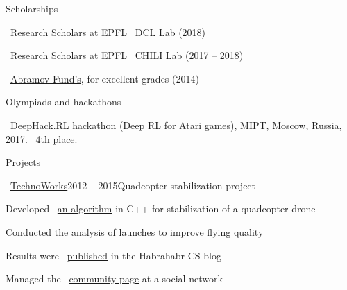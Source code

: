 \documentclass{resume} %
\begin{document}
\begin{rSection}{Scholarships}
\vspace{-1em}
\item \faExternalLink~\href{https://ic.epfl.ch/ResearchScholars}{Research Scholars} at EPFL \faExternalLink~\href{http://dcl.epfl.ch}{DCL} Lab (2018)
\item \faExternalLink~\href{https://ic.epfl.ch/ResearchScholars}{Research Scholars} at EPFL \faExternalLink~\href{http://chili.epfl.ch}{CHILI} Lab (2017 -- 2018)
\item \faExternalLink~\href{http://phystech-foundation.org/}{Abramov Fund's}, for excellent grades (2014)
\end{rSection}


\begin{rSection}{Olympiads and hackathons}
\vspace{-1em}
\item \faExternalLink~\href{http://web.archive.org/web/20170224094223/http://rl.deephack.me/}{DeepHack.RL} hackathon (Deep RL for Atari games), MIPT, Moscow, Russia, 2017. \faExternalLink~\href{https://github.com/sergeivolodin/deephack.rl}{4th place}.
\end{rSection}

\begin{rSection}{Projects}
	\begin{rSubsection}{\faExternalLink~\href{http://web.archive.org/web/20150626102512/http://technoworks.ru:80/}{TechnoWorks}}{2012 -- 2015}{Quadcopter stabilization project}{}
		\item Developed \faExternalLink~\href{https://github.com/it-workshop/Quadrocopter}{an algorithm} in C++ for stabilization of a quadcopter drone
		\item Conducted the analysis of launches to improve flying quality
		\item Results were \faExternalLink~\href{http://web.archive.org/web/20141016114551/http://habrahabr.ru/company/technoworks/blog/216437/}{published} in the Habrahabr CS blog
		\item Managed the \faExternalLink~\href{https://vk.com/technoworks}{community page} at a social network
	\end{rSubsection}
\end{rSection}
\end{document}
